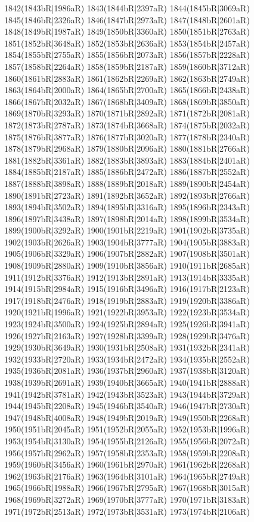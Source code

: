 1842(1843bR|1986aR) 1843(1844bR|2397aR) 1844(1845bR|3069aR) \\1845(1846bR|2326aR) 1846(1847bR|2973aR) 1847(1848bR|2601aR) 1848(1849bR|1987aR) 1849(1850bR|3360aR) 1850(1851bR|2763aR) 1851(1852bR|3648aR) 1852(1853bR|2636aR) 1853(1854bR|2457aR) \\1854(1855bR|2755aR) 1855(1856bR|2073aR) 1856(1857bR|2228aR) 1857(1858bR|2264aR) 1858(1859bR|2187aR) 1859(1860bR|3712aR) 1860(1861bR|2883aR) 1861(1862bR|2269aR) 1862(1863bR|2749aR) \\1863(1864bR|2000aR) 1864(1865bR|2700aR) 1865(1866bR|2438aR) 1866(1867bR|2032aR) 1867(1868bR|3409aR) 1868(1869bR|3850aR) 1869(1870bR|3293aR) 1870(1871bR|2892aR) 1871(1872bR|2081aR) \\1872(1873bR|2787aR) 1873(1874bR|3668aR) 1874(1875bR|2032aR) 1875(1876bR|3877aR) 1876(1877bR|3020aR) 1877(1878bR|2340aR) 1878(1879bR|2968aR) 1879(1880bR|2096aR) 1880(1881bR|2766aR) \\1881(1882bR|3361aR) 1882(1883bR|3893aR) 1883(1884bR|2401aR) 1884(1885bR|2187aR) 1885(1886bR|2472aR) 1886(1887bR|2552aR) 1887(1888bR|3898aR) 1888(1889bR|2018aR) 1889(1890bR|2454aR) \\1890(1891bR|2723aR) 1891(1892bR|3652aR) 1892(1893bR|2766aR) 1893(1894bR|3502aR) 1894(1895bR|3316aR) 1895(1896bR|2343aR) 1896(1897bR|3438aR) 1897(1898bR|2014aR) 1898(1899bR|3534aR) \\1899(1900bR|3292aR) 1900(1901bR|2219aR) 1901(1902bR|3735aR) 1902(1903bR|2626aR) 1903(1904bR|3777aR) 1904(1905bR|3883aR) 1905(1906bR|3329aR) 1906(1907bR|2882aR) 1907(1908bR|3501aR) \\1908(1909bR|2880aR) 1909(1910bR|3856aR) 1910(1911bR|2685aR) 1911(1912bR|3376aR) 1912(1913bR|2891aR) 1913(1914bR|3335aR) 1914(1915bR|2984aR) 1915(1916bR|3496aR) 1916(1917bR|2123aR) \\1917(1918bR|2476aR) 1918(1919bR|2883aR) 1919(1920bR|3386aR) 1920(1921bR|1996aR) 1921(1922bR|3953aR) 1922(1923bR|3534aR) 1923(1924bR|3500aR) 1924(1925bR|2894aR) 1925(1926bR|3941aR) \\1926(1927bR|2163aR) 1927(1928bR|3399aR) 1928(1929bR|3476aR) 1929(1930bR|3649aR) 1930(1931bR|2508aR) 1931(1932bR|2341aR) 1932(1933bR|2720aR) 1933(1934bR|2472aR) 1934(1935bR|2552aR) \\1935(1936bR|2081aR) 1936(1937bR|2960aR) 1937(1938bR|3120aR) 1938(1939bR|2691aR) 1939(1940bR|3665aR) 1940(1941bR|2888aR) 1941(1942bR|3781aR) 1942(1943bR|3523aR) 1943(1944bR|3729aR) \\1944(1945bR|2208aR) 1945(1946bR|3540aR) 1946(1947bR|2730aR) 1947(1948bR|4008aR) 1948(1949bR|2019aR) 1949(1950bR|2268aR) 1950(1951bR|2045aR) 1951(1952bR|2055aR) 1952(1953bR|1996aR) \\1953(1954bR|3130aR) 1954(1955bR|2126aR) 1955(1956bR|2072aR) 1956(1957bR|2962aR) 1957(1958bR|2353aR) 1958(1959bR|2208aR) 1959(1960bR|3456aR) 1960(1961bR|2970aR) 1961(1962bR|2268aR) \\1962(1963bR|2176aR) 1963(1964bR|3101aR) 1964(1965bR|2749aR) 1965(1966bR|1988aR) 1966(1967bR|2795aR) 1967(1968bR|3015aR) 1968(1969bR|3272aR) 1969(1970bR|3777aR) 1970(1971bR|3183aR) \\1971(1972bR|2513aR) 1972(1973bR|3531aR) 1973(1974bR|2106aR) 